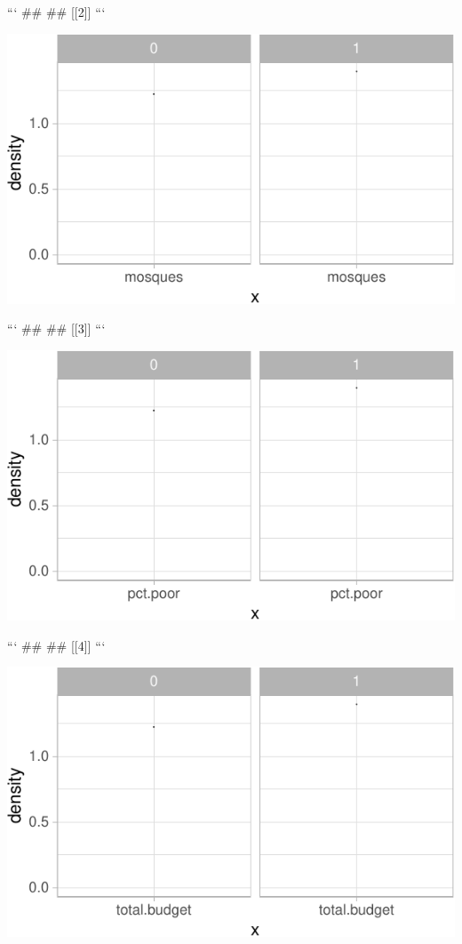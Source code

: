 \documentclass[]{tufte-handout}
\begin{document}
\begin{itemize}
```
## 
## [[2]]
```


\includegraphics{assignment_3_treatment_files/figure-latex/unnamed-chunk-6-2} 

```
## 
## [[3]]
```


\includegraphics{assignment_3_treatment_files/figure-latex/unnamed-chunk-6-3} 

```
## 
## [[4]]
```


\includegraphics{assignment_3_treatment_files/figure-latex/unnamed-chunk-6-4} 


\end{itemize}
\end{document}
